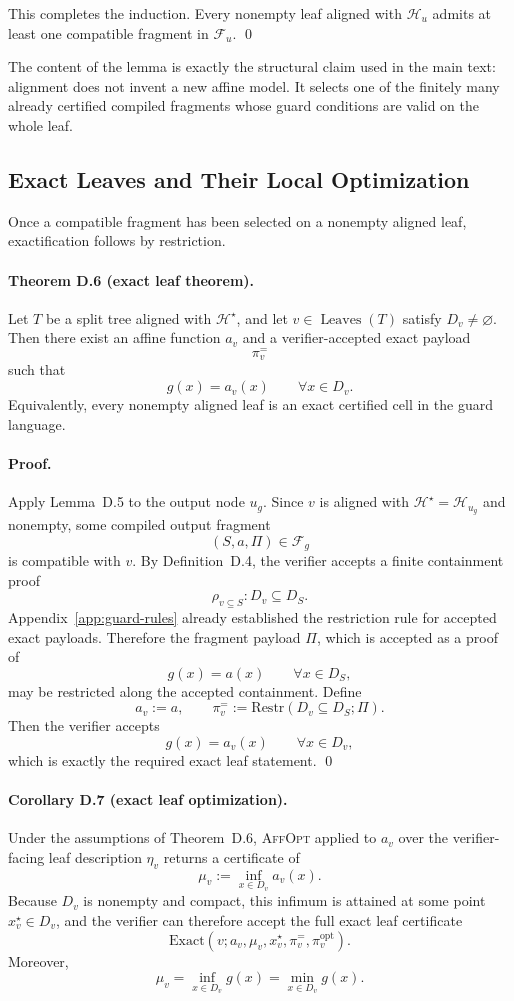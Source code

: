 This completes the induction. Every nonempty leaf aligned with $\mathcal H_u$ admits at least one compatible fragment in $\mathcal F_u$. \qed

The content of the lemma is exactly the structural claim used in the main text: alignment does not invent a new affine model. It selects one of the finitely many already certified compiled fragments whose guard conditions are valid on the whole leaf.

\subsection{Exact Leaves and Their Local Optimization}

Once a compatible fragment has been selected on a nonempty aligned leaf, exactification follows by restriction.

\paragraph{Theorem D.6 (exact leaf theorem).}
Let $T$ be a split tree aligned with $\mathcal H^\star$, and let $v\in\operatorname{Leaves}(T)$ satisfy $D_v\neq\varnothing$. Then there exist an affine function $a_v$ and a verifier-accepted exact payload
\[
 \pi_v^{=}
\]
such that
\[
 g(x)=a_v(x)
 \qquad \forall x\in D_v.
\tag{D.2}
\]
Equivalently, every nonempty aligned leaf is an exact certified cell in the guard language.

\paragraph{Proof.}
Apply Lemma~D.5 to the output node $u_g$. Since $v$ is aligned with $\mathcal H^\star=\mathcal H_{u_g}$ and nonempty, some compiled output fragment
\[
 (S,a,\Pi)\in\mathcal F_g
\]
is compatible with $v$. By Definition~D.4, the verifier accepts a finite containment proof
\[
 \rho_{v\subseteq S}: D_v\subseteq D_S.
\]
Appendix~\ref{app:guard-rules} already established the restriction rule for accepted exact payloads. Therefore the fragment payload $\Pi$, which is accepted as a proof of
\[
 g(x)=a(x)
 \qquad \forall x\in D_S,
\]
may be restricted along the accepted containment. Define
\[
 a_v:=a,
 \qquad
 \pi_v^{=}:=\mathrm{Restr}(D_v\subseteq D_S;\Pi).
\]
Then the verifier accepts
\[
 g(x)=a_v(x)
 \qquad \forall x\in D_v,
\]
which is exactly the required exact leaf statement. \qed

\paragraph{Corollary D.7 (exact leaf optimization).}
Under the assumptions of Theorem~D.6, \textsc{AffOpt} applied to $a_v$ over the verifier-facing leaf description $\eta_v$ returns a certificate of
\[
 \mu_v:=\inf_{x\in D_v} a_v(x).
\]
Because $D_v$ is nonempty and compact, this infimum is attained at some point $x_v^\star\in D_v$, and the verifier can therefore accept the full exact leaf certificate
\[
 \mathrm{Exact}(v;a_v,\mu_v,x_v^\star,\pi_v^{=},\pi_v^{\mathrm{opt}}).
\]
Moreover,
\[
 \mu_v=\inf_{x\in D_v}g(x)=\min_{x\in D_v}g(x).
\tag{D.3}
\]


